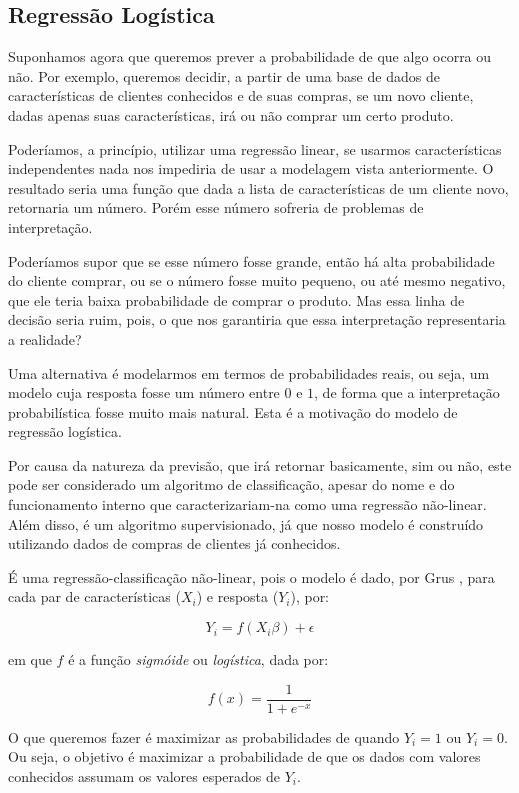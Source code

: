 \subsection{Regressão Logística}

Suponhamos agora que queremos prever a probabilidade de que algo ocorra ou não. Por exemplo, queremos decidir, a partir de uma base de dados de características de clientes conhecidos e de suas compras, se um novo cliente, dadas apenas suas características, irá ou não comprar um certo produto.

Poderíamos, a princípio, utilizar uma regressão linear, se usarmos características independentes nada nos impediria de usar a modelagem vista anteriormente. O resultado seria uma função que dada a lista de características de um cliente novo, retornaria um número. Porém esse número sofreria de problemas de interpretação.

Poderíamos supor que se esse número fosse grande, então há alta probabilidade do cliente comprar, ou se o número fosse muito pequeno, ou até mesmo negativo, que ele teria baixa probabilidade de comprar o produto. Mas essa linha de decisão seria ruim, pois, o que nos garantiria que essa interpretação representaria a realidade?

Uma alternativa é modelarmos em termos de probabilidades reais, ou seja, um modelo cuja resposta fosse um número entre $0$ e $1$, de forma que a interpretação probabilística fosse muito mais natural. Esta é a motivação do modelo de regressão logística.

Por causa da natureza da previsão, que irá retornar basicamente, sim ou não, este pode ser considerado um algoritmo de classificação, apesar do nome e do funcionamento interno que caracterizariam-na como uma regressão não-linear. Além disso, é um algoritmo supervisionado, já que nosso modelo é construído utilizando dados de compras de clientes já conhecidos.

É uma regressão-classificação não-linear, pois o modelo é dado, por Grus \citep{data}, para cada par de características ($X_i$) e resposta ($Y_i$), por:

\begin{equation}\label{log:f}
Y_i = f(X_i \beta) + \epsilon
\end{equation}

em que $f$ é a função \emph{sigmóide} ou \emph{logística}, dada por:

\[ f(x) =  \frac{1}{1 + e^{-x}} \]

O que queremos fazer é maximizar as probabilidades de quando $Y_i = 1$ ou $Y_i = 0$. Ou seja, o objetivo é maximizar a probabilidade de que os dados com valores conhecidos assumam os valores esperados de $Y_i$. 

